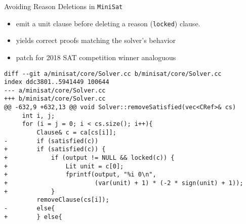 \documentclass[final,hyperref={pdfpagelabels=true}]{beamer}
\begin{document}
\begin{frame}[fragile]
\begin{columns}[t]
\begin{column}{.45\textwidth}
    \begin{block}{Avoiding Reason Deletions in \texttt{MiniSat}}
	\begin{itemize}
            \item emit a unit clause before deleting a reason (\texttt{locked}) clause.
            \item yields correct proofs matching the solver's behavior
            \item patch for 2018 SAT competition winner analoguous
	\end{itemize}
	\vspace{1cm}
        {\footnotesize
            \begin{verbatim}
diff --git a/minisat/core/Solver.cc b/minisat/core/Solver.cc
index ddc3801..5941449 100644
--- a/minisat/core/Solver.cc
+++ b/minisat/core/Solver.cc
@@ -632,9 +632,13 @@ void Solver::removeSatisfied(vec<CRef>& cs)
     int i, j;
     for (i = j = 0; i < cs.size(); i++){
         Clause& c = ca[cs[i]];
-        if (satisfied(c))
+        if (satisfied(c)) {
+            if (output != NULL && locked(c)) {
+                Lit unit = c[0];
+                fprintf(output, "%i 0\n",
+                        (var(unit) + 1) * (-2 * sign(unit) + 1));
+            }
         removeClause(cs[i]);
-        else{
+        } else{
            \end{verbatim}
        }
    \end{block}
    \end{column}


\end{columns}
\end{frame}
\end{document}
